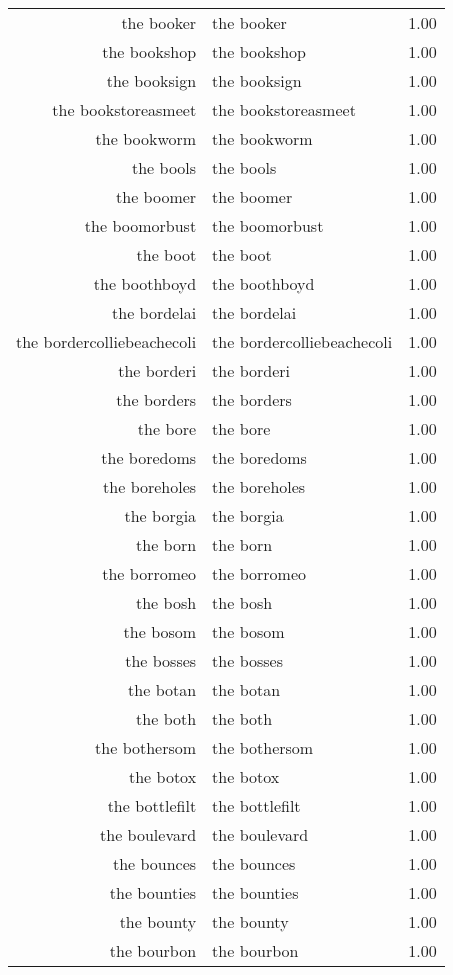 \begin{table}[ht]
\begin{tabular}{rlr}
  the booker & the booker & 1.00 \\ 
  the bookshop & the bookshop & 1.00 \\ 
  the booksign & the booksign & 1.00 \\ 
  the bookstoreasmeet & the bookstoreasmeet & 1.00 \\ 
  the bookworm & the bookworm & 1.00 \\ 
  the bools & the bools & 1.00 \\ 
  the boomer & the boomer & 1.00 \\ 
  the boomorbust & the boomorbust & 1.00 \\ 
  the boot & the boot & 1.00 \\ 
  the boothboyd & the boothboyd & 1.00 \\ 
  the bordelai & the bordelai & 1.00 \\ 
  the bordercolliebeachecoli & the bordercolliebeachecoli & 1.00 \\ 
  the borderi & the borderi & 1.00 \\ 
  the borders & the borders & 1.00 \\ 
  the bore & the bore & 1.00 \\ 
  the boredoms & the boredoms & 1.00 \\ 
  the boreholes & the boreholes & 1.00 \\ 
  the borgia & the borgia & 1.00 \\ 
  the born & the born & 1.00 \\ 
  the borromeo & the borromeo & 1.00 \\ 
  the bosh & the bosh & 1.00 \\ 
  the bosom & the bosom & 1.00 \\ 
  the bosses & the bosses & 1.00 \\ 
  the botan & the botan & 1.00 \\ 
  the both & the both & 1.00 \\ 
  the bothersom & the bothersom & 1.00 \\ 
  the botox & the botox & 1.00 \\ 
  the bottlefilt & the bottlefilt & 1.00 \\ 
  the boulevard & the boulevard & 1.00 \\ 
  the bounces & the bounces & 1.00 \\ 
  the bounties & the bounties & 1.00 \\ 
  the bounty & the bounty & 1.00 \\ 
  the bourbon & the bourbon & 1.00 \\ 

\end{tabular}
\end{table}
